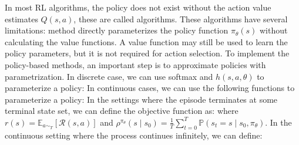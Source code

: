 \documentclass[12pt]{report}
\begin{document}
In most RL algorithms, the policy does not exist without the action value estimates $Q(s,a)$, these are called  algorithms.
These algorithms have several limitations:
 method directly parameterizes the policy function $\pi_\theta(s)$ without calculating the value functions.
A value function may still be used to learn the policy parameters, but it is not required for action selection. To implement the policy-based methods,
an important step is to approximate policies with parametrization. In discrete case, we can use softmax and 
$h(s,a,\theta)$ to parameterize a policy:
In continuous cases, we can use the following functions to parameterize a policy:
In the settings where the episode terminates at some terminal state set, we can define the objective function as:
where $r(s)=\mathbb{E}_{a\operatorname*{\sim}_{T}}[\mathcal{R}(s,a)]$ and $\rho^{\pi_\theta}(s\mid s_0)=\frac{1}{T}\sum_{t=0}^T\mathbb{P}(s_t=s\mid s_0,\pi_\theta)$.
In the continuous setting where the process continues infinitely, we can define:
\end{document}
